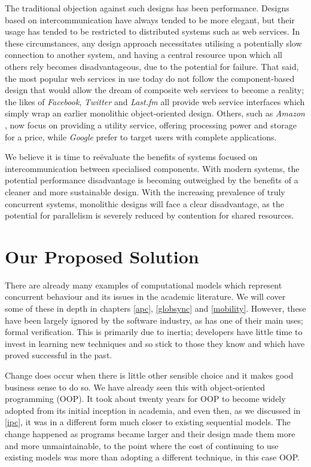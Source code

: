 The traditional objection against such designs has been performance.
Designs based on intercommunication have always tended to be more
elegant, but their usage has tended to be restricted to distributed
systems such as web services.  In these circumstances, any design
approach necessitates utilising a potentially slow connection to
another system, and having a central resource upon which all others
rely becomes disadvantageous, due to the potential for failure.  That
said, the most popular web services in use today do not follow the
component-based design that would allow the dream of composite web
services \cite{cashews-sem} to become a reality; the likes of
\emph{Facebook}, \emph{Twitter} and \emph{Last.fm}
\cite{facebook,twitter,lastfm} all provide web service
interfaces which simply wrap an earlier monolithic object-oriented
design.  Others, such as \emph{Amazon} \cite{amazon}, now focus on
providing a utility service, offering processing power and storage for
a price, while \emph{Google} \cite{google} prefer to target users with
complete applications.

We believe it is time to re{\"e}valuate the benefits of systems focused on
intercommunication between specialised components.  With modern
systems, the potential performance disadvantage is becoming outweighed
by the benefits of a cleaner and more sustainable design.  With the
increasing prevalence of truly concurrent systems, monolithic designs
will face a clear disadvantage, as the potential for parallelism is
severely reduced by contention for shared resources.

\section{Our Proposed Solution}
\label{solution}

There are already many examples of computational models which
represent concurrent behaviour and its issues in the academic
literature.  We will cover some of these in depth in chapters
\ref{apc}, \ref{globsync} and \ref{mobility}.  However, these have
been largely ignored by the software industry, as has one of their
main uses; formal verification.  This is primarily due to inertia;
developers have little time to invest in learning new techniques and
so stick to those they know and which have proved successful in the
past.

Change does occur when there is little other sensible choice and it
makes good business sense to do so.  We have already seen this with
object-oriented programming (OOP). It took about twenty years for OOP
to become widely adopted from its initial inception in academia, and
even then, as we discussed in \ref{ipc}, it was in a different form
much closer to existing sequential models.  The change happened as
programs became larger and their design made them more and more
unmaintainable, to the point where the cost of continuing to use
existing models was more than adopting a different technique, in this
case OOP.


